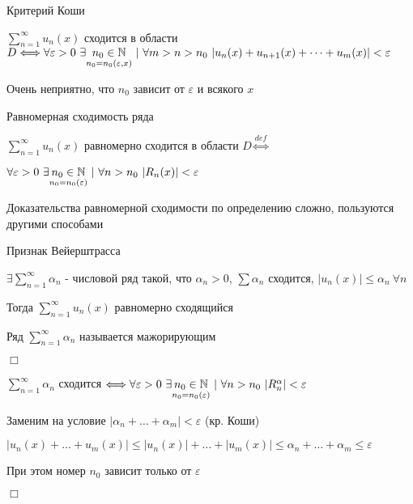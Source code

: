 \documentclass[12pt]{article}
\begin{document}
    \begin{MyTheorem}
        \Ths Критерий Коши

        $\sum_{n = 1}^\infty u_n(x)$ сходится в области $D \Longleftrightarrow
        \forall \varepsilon > 0 \ \exists \underset{n_0 = n_0(\varepsilon, x)}{n_0 \in \mathbb{N}} \ | \
        \forall m > n > n_0 \ |u_n(x) + u_{n + 1}(x) + \dots + u_m(x)| < \varepsilon$
    \end{MyTheorem}

    \Notas Очень неприятно, что $n_0$ зависит от $\varepsilon$ и всякого $x$

    \Def Равномерная сходимость ряда

    $\sum_{n = 1}^\infty u_n(x)$ равномерно сходится в области $D \overset{def}{\Longleftrightarrow}$

    $\forall \varepsilon > 0 \ \exists \underset{n_0 = n_0(\varepsilon)}{n_0 \in \mathbb{N}} \ | \ \forall n > n_0 \ |R_n(x)| < \varepsilon$

    \Nota Доказательства равномерной сходимости по определению сложно, пользуются другими способами

    \begin{MyTheorem}
        \Ths Признак Вейерштрасса

        $\exists \sum_{n = 1}^\infty \alpha_n$ - числовой ряд такой, что $\alpha_n > 0$, $\sum \alpha_n$ сходится,
        $|u_n(x)| \leq \alpha_n \ \forall n$

        Тогда $\sum_{n = 1}^\infty u_n(x)$ равномерно сходящийся

    \end{MyTheorem}

    \Nota Ряд $\sum_{n = 1}^\infty \alpha_n$ называется мажорирующим

    \begin{MyProof}
        $\Box$

        $\sum_{n = 1}^\infty \alpha_n$ сходится $\Longleftrightarrow \forall \varepsilon > 0 \ \exists \underset{n_0 = n_0(\varepsilon)}{n_0 \in \mathbb{N}} \ | \
        \forall n > n_0 \ |R_n^\alpha| < \varepsilon$

        Заменим на условие $|\alpha_n + \dots + \alpha_m| < \varepsilon$ (кр. Коши)

        $|u_n(x) + \dots + u_m(x)| \leq |u_n(x)| + \dots + |u_m(x)| \leq \alpha_n + \dots + \alpha_m \leq \varepsilon$

        При этом номер $n_0$ зависит только от $\varepsilon$

        $\Box$
    \end{MyProof}
\end{document}
